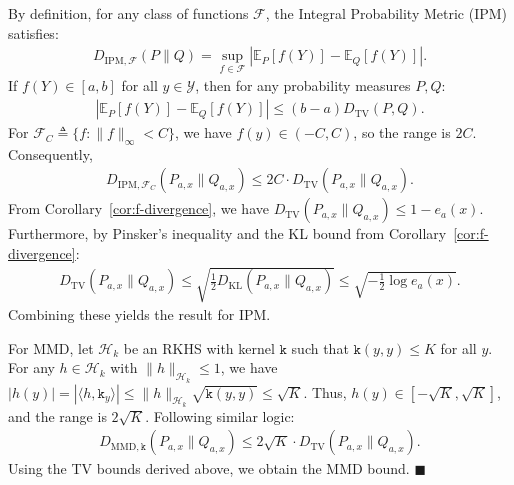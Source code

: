 By definition, for any class of functions $\mathcal{F}$, the Integral Probability Metric (IPM) satisfies:
\begin{align}
    D_{\mathrm{IPM},\mathcal{F}}(P \| Q) = \sup_{f \in \mathcal{F}} \left| \mathbb{E}_{P}[f(Y)] - \mathbb{E}_{Q}[f(Y)] \right|.
\end{align}
If $f(Y) \in [a, b]$ for all $y \in \mathcal{Y}$, then for any probability measures $P, Q$:
\begin{align}
    \left| \mathbb{E}_{P}[f(Y)] - \mathbb{E}_{Q}[f(Y)] \right| \leq (b-a) D_{\mathrm{TV}}(P, Q).
\end{align}
For $\mathcal{F}_C \triangleq \{ f: \|f\|_{\infty} < C \}$, we have $f(y) \in (-C, C)$, so the range is $2C$. Consequently, 
\begin{align}
    D_{\mathrm{IPM},\mathcal{F}_C}(P_{a,x} \| Q_{a,x}) \leq 2C \cdot D_{\mathrm{TV}}(P_{a,x} \| Q_{a,x}).
\end{align}
From Corollary~\ref{cor:f-divergence}, we have $D_{\mathrm{TV}}(P_{a,x} \| Q_{a,x}) \leq 1 - e_a(x)$. Furthermore, by Pinsker's inequality and the KL bound from Corollary~\ref{cor:f-divergence}:
\begin{align}
    D_{\mathrm{TV}}(P_{a,x} \| Q_{a,x}) \leq \sqrt{\frac{1}{2} D_{\mathrm{KL}}(P_{a,x} \| Q_{a,x})} \leq \sqrt{-\frac{1}{2} \log e_a(x)}.
\end{align}
Combining these yields the result for IPM.

For MMD, let $\mathcal{H}_k$ be an RKHS with kernel $\mathtt{k}$ such that $\mathtt{k}(y, y) \le K$ for all $y$. For any $h \in \mathcal{H}_k$ with $\|h\|_{\mathcal{H}_k} \le 1$, we have $|h(y)| = |\langle h, \mathtt{k}_y \rangle| \le \|h\|_{\mathcal{H}_k} \sqrt{\mathtt{k}(y, y)} \le \sqrt{K}$. Thus, $h(y) \in [-\sqrt{K}, \sqrt{K}]$, and the range is $2\sqrt{K}$. Following similar logic:
\begin{align}
    D_{\mathrm{MMD},\mathtt{k}}(P_{a,x} \| Q_{a,x}) \leq 2\sqrt{K} \cdot D_{\mathrm{TV}}(P_{a,x} \| Q_{a,x}).
\end{align}
Using the TV bounds derived above, we obtain the MMD bound. \hfill $\blacksquare$

